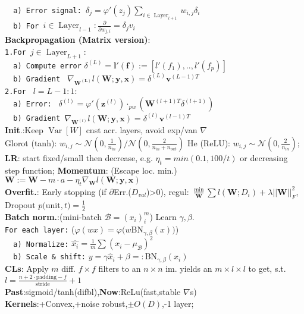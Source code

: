 \documentclass[11pt]{article}
\newcommand{\bv}[1]{\mathbf{#1}}
\DeclareMathOperator*{\Layer}{Layer}
\DeclareMathOperator*{\V}{Var}
\begin{document}
\begin{multicols}{4}
\verb|  a) Error signal: |$\delta_j=\varphi'(z_j)\sum_{i\in\Layer_{l+1}}w_{i,j}\delta_i$\\
\verb|  b) For |$i\in \Layer_{l-1}:\frac{\partial}{\partial w_{j,i}}=\delta_jv_i$\\
\textbf{Backpropagation (Matrix version)}:\\
\verb|1.For |$j\in\Layer_{L+1}$:\\
\verb|  a) Compute error| $\delta^{(L)}=\bv{l}'(\bv{f}):=[l'(f_1),..,l'(f_p)]$\\
\verb|  b) Gradient | $\nabla_{\bv{W^{(L)}}}l(\bv{W};\bv{y},\bv{x})=\delta^{(L)}\bv{v}^{(L-1)T}$\\
\verb|2.For | $l=L-1:1:$\\
\verb|  a) Error: | $\delta^{(l)}=\varphi'(\bv{z}^{(l)})\cdot_{pw}(\bv{W}^{(l+1)T}\delta^{(l+1)})$\\
\verb|  b) Gradient |$\nabla_{\bv{W}^{(l)}}l(\bv{W};\bv{y},\bv{x})=\delta^{(l)}\bv{v}^{(l-1)T}$\\
\textbf{Init}.:Keep $\V[W]$ cnst acr. layers, avoid exp/van $\nabla$\\
Glorot (tanh): $w_{i,j}\sim\mathcal{N}(0,\frac{1}{n_{in}})/\mathcal{N}(0,\frac{2}{n_{in}+n_{out}})$
He (ReLU): $w_{i,j}\sim\mathcal{N}(0,\frac{2}{n_{in}})$; \textbf{LR}: start fixed/small then decrease, e.g. $\eta_t=min(0.1,100/t)$ or decreasing step function; \textbf{Momentum}: (Escape loc. min.) $\bv{W}:=\bv{W}-m\cdot a-\eta_t\nabla_{\bv{W}}l(\bv{W};\bv{y},\bv{x})$\\
\textbf{Overfit.}: Early stopping (if $\partial$Err.($D_{val}$)>0), regul: $\frac{\min}{\bv{W}}\sum l(\bv{W};D_i)+\lambda||\bv{W}||^2_F$, Dropout $p($unit$,t)=\frac{1}{2}$\\
\textbf{Batch norm.}:(mini-batch $\mathcal{B}=(x_i)^m_i$) Learn $\gamma,\beta$.\\
\verb|For each layer:| ($\varphi(wx)=\varphi(w$BN$_{\gamma,\beta}(x))$)\\
\verb|  a) Normalize:| $\hat{x_i}=\frac{1}{m}\sum(x_i-\mu_\mathcal{B})^2$\\
\verb|  b) Scale & shift:| $y=\gamma\hat{x}_i+\beta=:$BN$_{\gamma,\beta}(x_i)$\\
\textbf{CLs}: Apply $m$ diff. $f\times f$ filters to an $n\times n$ im. yields an $m\times l\times l$ to get, s.t. $l=\frac{n+2\cdot\textrm{padding}-f}{\textrm{stride}}+1$\\
\textbf{Past}:sigmoid/tanh(difbl),\textbf{Now}:ReLu(fast,stable $\nabla$s)\\
\textbf{Kernels}:+Convex,+noise robust,$\pm O(D)$,-1 layer;

\end{multicols}
\end{document}
